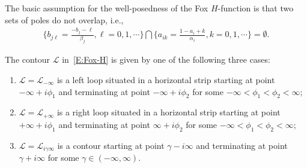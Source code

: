 \documentclass[11pt]{article}
\begin{document}
The basic assumption for the well-posedness of the Fox $H$-function is that two
sets of poles do not overlap, i.e.,
\begin{align}\label{E:poles}
  \bigg\{b_{j\ell}=\frac{-b_j-\ell}{\beta_j },  \ell =0, 1, \cdots\bigg\} \bigcap
  \bigg\{a_{ik}   =\frac{1-a_i + k}{\alpha_i},  k=0, 1,     \cdots\bigg\} = \emptyset.
\end{align}

The contour $\mathcal{L}$ in~\eqref{E:Fox-H} is given by one of the following
three cases:
\begin{enumerate}

  \item $\mathcal{L}=\mathcal{L}_{-\infty}$ is a left loop situated in a
    horizontal strip starting at point $-\infty+i\phi_1$ and terminating at
    point $-\infty+i\phi_2$ for some $-\infty<\phi_1< \phi_2<\infty$;

  \item $\mathcal{L}=\mathcal{L}_{+\infty}$ is a right loop situated in a
    horizontal strip starting at point $+\infty+i\phi_1$ and terminating at
    point $\infty+i\phi_2$ for some $-\infty<\phi_1< \phi_2<\infty$;

  \item $\mathcal{L}=\mathcal{L}_{i\gamma\infty}$ is a contour starting at point
    $\gamma-i\infty$ and terminating at point $\gamma+i\infty$ for some
    $\gamma\in(-\infty, \infty)$.

\end{enumerate}
\end{document}
